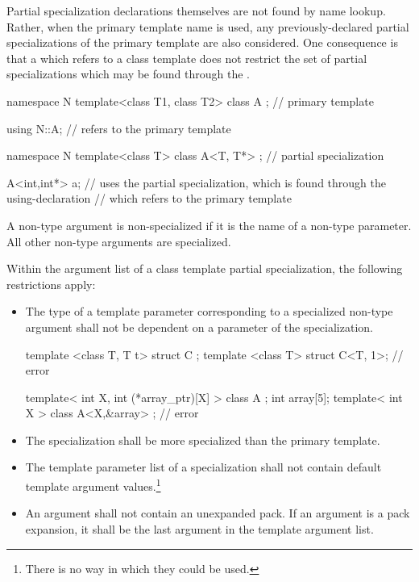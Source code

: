 \pnum
Partial specialization declarations themselves are not found by name lookup.
Rather, when the primary template name is used, any previously-declared partial
specializations of the primary template are also considered.
One consequence is
that a
which refers to a class template does not restrict the set of partial specializations
which may be found through the
.
\begin{example}

\begin{codeblock}
namespace N {
  template<class T1, class T2> class A { };     // primary template
}

using N::A;                                     // refers to the primary template

namespace N {
  template<class T> class A<T, T*> { };         // partial specialization
}

A<int,int*> a;      // uses the partial specialization, which is found through the using-declaration
                    // which refers to the primary template
\end{codeblock}
\end{example}

\pnum
A non-type argument is non-specialized if it is the name of a non-type
parameter.
All other non-type arguments are specialized.

\pnum
Within the argument list of a class template partial specialization,
the following restrictions apply:

\begin{itemize}
\item
The type of a template parameter corresponding to a specialized non-type argument
shall not be dependent on a parameter of the specialization.
\begin{example}

\begin{codeblock}
template <class T, T t> struct C {};
template <class T> struct C<T, 1>;              // error

template< int X, int (*array_ptr)[X] > class A {};
int array[5];
template< int X > class A<X,&array> { };        // error
\end{codeblock}

\end{example}
\item
The specialization shall be more specialized than the primary
template.

\item
The template parameter list of a specialization shall not contain default
template argument values.\footnote{There is no way in which they could be used.}
\item
An argument shall not contain an unexpanded pack. If
an argument is a pack expansion, it shall be
the last argument in the template argument list.
\end{itemize}

